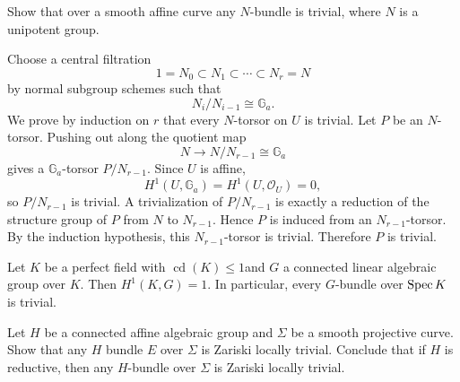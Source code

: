 \documentclass[12pt]{article}
\begin{document}
\begin{exercise}
Show that over a smooth affine curve any $N$-bundle is trivial, where $N$ is a unipotent group.
\end{exercise}

\begin{solution}Choose a central filtration
\[
1=N_0\subset N_1\subset \cdots \subset N_r=N
\]
by normal subgroup schemes such that
\[
N_i/N_{i-1}\cong \mathbb G_a.
\]
We prove by induction on \(r\) that every \(N\)-torsor on \(U\) is trivial. Let \(P\) be an \(N\)-torsor. Pushing out along the quotient map
\[
N\to N/N_{r-1}\cong \mathbb G_a
\]
gives a \(\mathbb G_a\)-torsor $P/N_{r-1}$. Since \(U\) is affine,
\[
H^1(U,\mathbb G_a)=H^1(U,\mathcal O_U)=0,
\]
so \(P/N_{r-1}\) is trivial. A trivialization of \(P/N_{r-1}\) is exactly a reduction of the structure group of \(P\) from \(N\) to \(N_{r-1}\). Hence \(P\) is induced from an \(N_{r-1}\)-torsor. By the induction hypothesis, this \(N_{r-1}\)-torsor is trivial. Therefore \(P\) is trivial.
\end{solution}

\begin{theorem}[Steinberg]
    Let $K$ be a perfect field with $\operatorname{cd}(K)\le 1 $and $G$ a connected linear algebraic group over $K$. Then $H^1(K,G)=1$. In particular, every $G$-bundle over $\operatorname{Spec} K$ is trivial.
\end{theorem}

\begin{exercise}
    Let $H$ be a connected affine algebraic group and $\Sigma$ be a smooth projective curve. Show that any $H$ bundle $E$ over $\Sigma$ is Zariski locally trivial. Conclude that if $H$ is reductive, then any $H$-bundle over $\Sigma$ is Zariski locally trivial.
\end{exercise}
\end{document}
